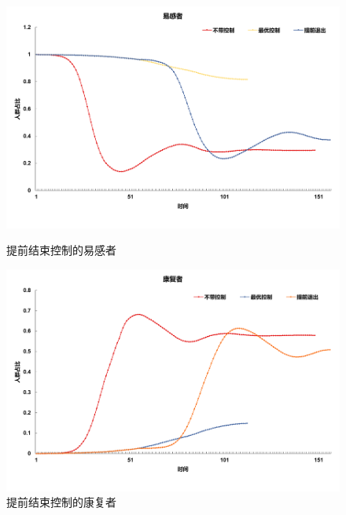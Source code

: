 \begin{figure}[htbp]
	\begin{minipage}{0.49\linewidth}
		\centering
		\includegraphics[width=0.9\linewidth]{fig/image028.png}
		\caption{提前结束控制的易感者}
		\label{fig:ima13}%
	\end{minipage}
	\begin{minipage}{0.49\linewidth}
		\centering
		\includegraphics[width=0.9\linewidth]{fig/image026.png}
		\caption{提前结束控制的康复者}
		\label{fig:ima14}%
	\end{minipage}


\end{figure}
